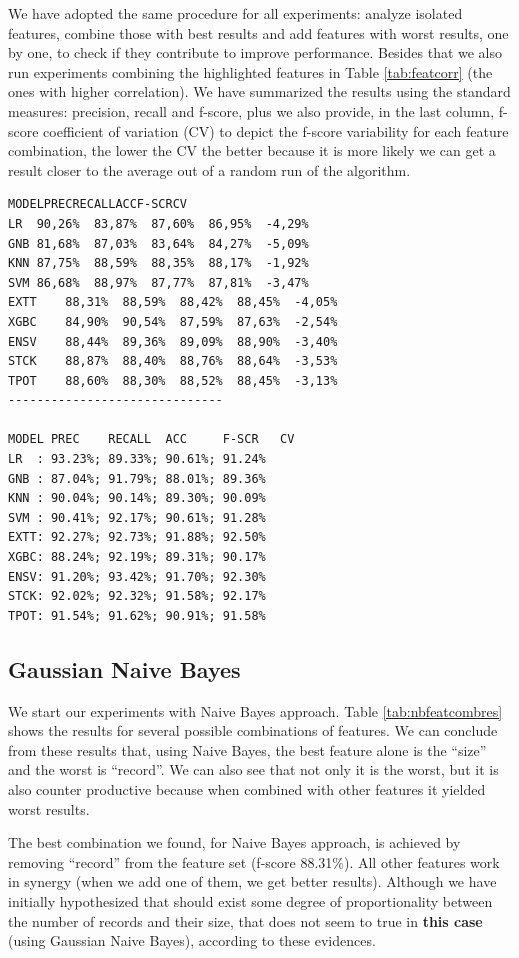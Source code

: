 We have adopted the same procedure for all experiments: analyze isolated
features, combine those with best results and add features with worst results,
one by one, to check if they contribute to improve performance. Besides that we
also run experiments combining the highlighted features in Table
\ref{tab:featcorr} (the ones with higher correlation). We have summarized the
results using the standard measures: precision, recall and f-score, plus we also
provide, in the last column, f-score coefficient of variation (CV) to depict the
f-score variability for each feature combination, the lower the CV the better
because it is more likely we can get a result closer to the average out of a
random run of the algorithm.

\begin{verbatim}
MODELPRECRECALLACCF-SCRCV					
LR	90,26%	83,87%	87,60%	86,95%	-4,29%
GNB	81,68%	87,03%	83,64%	84,27%	-5,09%
KNN	87,75%	88,59%	88,35%	88,17%	-1,92%
SVM	86,68%	88,97%	87,77%	87,81%	-3,47%
EXTT	88,31%	88,59%	88,42%	88,45%	-4,05%
XGBC	84,90%	90,54%	87,59%	87,63%	-2,54%
ENSV	88,44%	89,36%	89,09%	88,90%	-3,40%
STCK	88,87%	88,40%	88,76%	88,64%	-3,53%
TPOT	88,60%	88,30%	88,52%	88,45%	-3,13%
------------------------------

MODEL PREC    RECALL  ACC     F-SCR   CV
LR  : 93.23%; 89.33%; 90.61%; 91.24%
GNB : 87.04%; 91.79%; 88.01%; 89.36%
KNN : 90.04%; 90.14%; 89.30%; 90.09%
SVM : 90.41%; 92.17%; 90.61%; 91.28%
EXTT: 92.27%; 92.73%; 91.88%; 92.50%
XGBC: 88.24%; 92.19%; 89.31%; 90.17%
ENSV: 91.20%; 93.42%; 91.70%; 92.30%
STCK: 92.02%; 92.32%; 91.58%; 92.17%
TPOT: 91.54%; 91.62%; 90.91%; 91.58%
\end{verbatim}

\subsection{Gaussian Naive Bayes}\label{ss:gnb}
We start our experiments with Naive Bayes approach. Table
\ref{tab:nbfeatcombres} shows the results for several possible combinations of
features. We can conclude from these results that, using Naive Bayes, the best
feature alone is the ``size'' and the worst is ``record''. We can also see that
not only it is the worst, but it is also counter productive because when
combined with other features it yielded worst results.

The best combination we found, for Naive Bayes approach, is achieved by removing
``record'' from the feature set (f-score 88.31\%). All other features work in
synergy (when we add one of them, we get better results). Although we have
initially hypothesized that should exist some degree of proportionality between
the number of records and their size, that does not seem to true in \textbf{this
case} (using Gaussian Naive Bayes), according to these evidences.

